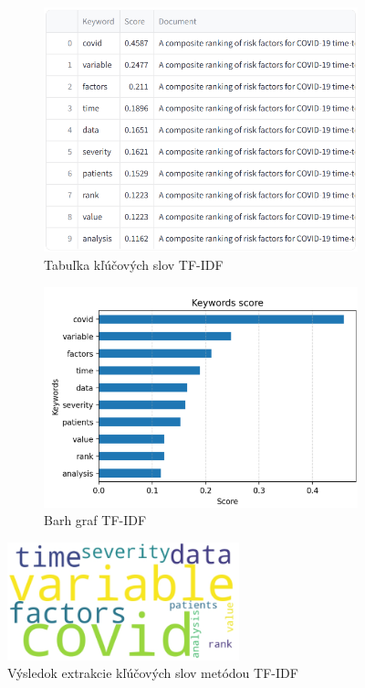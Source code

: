 \documentclass[a4paper,12pt]{article}
\begin{document}
\begin{figure}[htbp]
    \centering
    \begin{subfigure}[b]{0.45\textwidth}
        \includegraphics[width=\textwidth]{../images/tfidf_table.png}
        \caption{Tabuľka kľúčových slov TF-IDF}
        \label{fig:tfidf_table}
    \end{subfigure}
    \hfill
    \begin{subfigure}[b]{0.45\textwidth}
        \includegraphics[width=\textwidth]{../images/tfidf_barh.png}
        \caption{Barh graf TF-IDF}
        \label{fig:tfidf_barh}
    \end{subfigure}

    \vspace{0.5cm}

    \includegraphics[width=0.6\textwidth]{../images/tfidf_wordcloud.png}
    \caption{Výsledok extrakcie kľúčových slov metódou TF-IDF}
    \label{fig:tfidf}
\end{figure}
\end{document}
